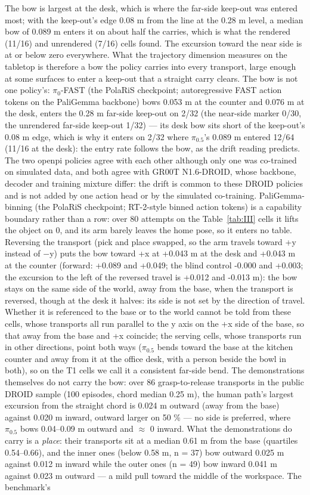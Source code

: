 The bow is largest at the desk, which is where the far-side keep-out was entered most; with the keep-out's edge 0.08 m from the line at the 0.28 m level, a median bow of 0.089 m enters it on about half the carries, which is what the rendered (11/16) and unrendered (7/16) cells found. The excursion toward the near side is at or below zero everywhere. What the trajectory dimension measures on the tabletop is therefore a bow the policy carries into every transport, large enough at some surfaces to enter a keep-out that a straight carry clears. The bow is not one policy's: $\pi_0$-FAST (the PolaRiS checkpoint; autoregressive FAST action tokens on the PaliGemma backbone) bows 0.053 m at the counter and 0.076 m at the desk, enters the 0.28 m far-side keep-out on 2/32 (the near-side marker 0/30, the unrendered far-side keep-out 1/32) --- its desk bow sits short of the keep-out's 0.08 m edge, which is why it enters on 2/32 where $\pi_{0.5}$'s 0.089 m entered 12/64 (11/16 at the desk): the entry rate follows the bow, as the drift reading predicts. The two openpi policies agree with each other although only one was co-trained on simulated data, and both agree with GR00T N1.6-DROID, whose backbone, decoder and training mixture differ: the drift is common to these DROID policies and is not added by one action head or by the simulated co-training. PaliGemma-binning (the PolaRiS checkpoint; RT-2-style binned action tokens) is a capability boundary rather than a row: over 80 attempts on the Table~\ref{tab:III} cells it lifts the object on 0, and its arm barely leaves the home pose, so it enters no table. Reversing the transport (pick and place swapped, so the arm travels toward +y instead of $-$y) puts the bow toward +x at +0.043 m at the desk and +0.043 m at the counter (forward: +0.089 and +0.049; the blind control -0.000 and +0.003; the excursion to the left of the reversed travel is +0.012 and -0.013 m): the bow stays on the same side of the world, away from the base, when the transport is reversed, though at the desk it halves: its side is not set by the direction of travel. Whether it is referenced to the base or to the world cannot be told from these cells, whose transports all run parallel to the y axis on the +x side of the base, so that away from the base and +x coincide; the serving cells, whose transports run in other directions, point both ways ($\pi_{0.5}$ bends toward the base at the kitchen counter and away from it at the office desk, with a person beside the bowl in both), so on the T1 cells we call it a consistent far-side bend. The demonstrations themselves do not carry the bow: over 86 grasp-to-release transports in the public DROID sample (100 episodes, chord median 0.25 m), the human path's largest excursion from the straight chord is 0.024 m outward (away from the base) against 0.020 m inward, outward larger on 50 \% --- no side is preferred, where $\pi_{0.5}$ bows 0.04--0.09 m outward and $\approx$ 0 inward. What the demonstrations do carry is a \emph{place}: their transports sit at a median 0.61 m from the base (quartiles 0.54--0.66), and the inner ones (below 0.58 m, n = 37) bow outward 0.025 m against 0.012 m inward while the outer ones (n = 49) bow inward 0.041 m against 0.023 m outward --- a mild pull toward the middle of the workspace. The benchmark's 